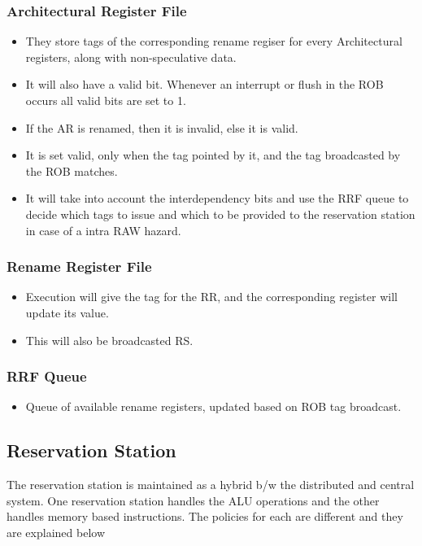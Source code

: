 \documentclass{article}
\begin{document}
\subsubsection{Architectural Register File}
\begin{itemize}
\item They store tags of the corresponding rename regiser for every Architectural registers, along with non-speculative data.
\item It will also have a valid bit. Whenever an interrupt or flush in the ROB occurs all valid bits are set to 1.
\item If the AR is renamed, then it is invalid, else it is valid.
\item It is set valid, only when the tag pointed by it, and the tag broadcasted by the ROB matches.
\item It will take into account the interdependency bits and use the RRF queue to decide which tags to issue and which to be provided to the 
reservation station in case of a intra RAW hazard.
\end{itemize}
\subsubsection{Rename Register File}
\begin{itemize}
\item Execution will give the tag for the RR, and the corresponding register will update its value.
\item This will also be broadcasted RS.
\end{itemize}
\subsubsection{RRF Queue}
\begin{itemize}
\item Queue of available rename registers, updated based on ROB tag broadcast.
\end{itemize}
\subsection{Reservation Station}
The reservation station is maintained as a hybrid b/w the distributed and central system. One reservation station handles the ALU operations and the other handles memory based instructions. The policies for each are different and they are explained below
\end{document}
